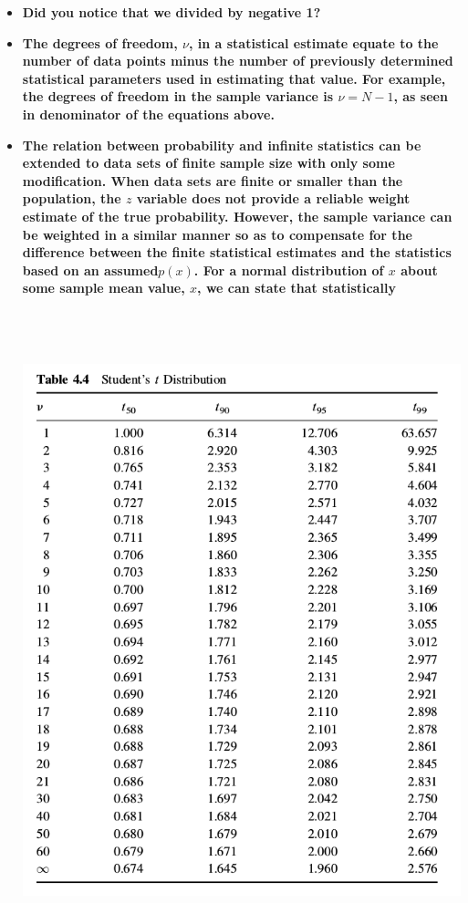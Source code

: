 \documentclass[11pt]{article}
\begin{document}
\begin{itemize}
\begin{itemize}
\item \textbf{ \Large Did you notice that we divided by negative 1? } \\


\item \textbf{\Large The degrees of freedom, $\nu$, in a statistical estimate equate to the number
of data points minus the number of previously determined statistical parameters used in estimating
that value. For example, the degrees of freedom in the sample variance is $\nu=N-1$, as seen in
denominator of the equations above.} 

\newpage
\item \textbf{\Large The relation between probability and infinite statistics can be extended to data sets of finite
sample size with only some modification. When data sets are finite or smaller than the population,
the $z$ variable does not provide a reliable weight estimate of the true probability. However, the
sample variance can be weighted in a similar manner so as to compensate for the difference between
the finite statistical estimates and the statistics based on an assumed$p(x)$. For a normal distribution
of $x$ about some sample mean value, $x$, we can state that statistically} \\\\


\vspace{0mm}\\ \\


\newpage
\includegraphics[scale=0.75]{lecture4_fig10.png} 



\end{itemize}
\end{itemize}
\end{document}
